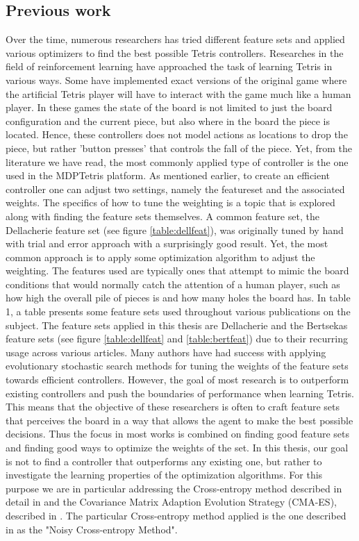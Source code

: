 \subsection{Previous work \label{prevWork}}
Over the time, numerous researchers has tried different feature 
sets and applied various optimizers to find the best 
possible Tetris controllers. Researches in the field
of reinforcement learning have approached the task of learning Tetris
in various ways. Some have implemented exact versions of the original game
where the artificial Tetris player will have to interact with the 
game much like a human player. In these games the state of the board is not limited
to just the board configuration and the current piece, but also where in the 
board the piece is located. Hence, these controllers does not model actions 
as locations to drop the piece, but rather 'button presses' that controls the
fall of the piece. Yet, from the literature we have read, the most commonly applied 
type of controller is the one used in the MDPTetris platform. As mentioned earlier,
to create an efficient controller one can adjust two settings, namely the featureset 
and the associated weights. 
The specifics of how to tune the weighting is a topic that is 
explored along with finding the feature sets themselves. A common 
feature set, the Dellacherie feature set (see figure \ref{table:dellfeat}),
was originally tuned by hand with trial and error approach with a surprisingly 
good result. Yet, the most common approach is to apply some optimization 
algorithm to adjust the weighting.
The features used are typically
ones that attempt to mimic the board conditions that would
normally catch the attention of a human player, such as
how high the overall pile of pieces is and how many holes 
the board has. In \citep{scherrer2009:b} table 1, a table 
presents some feature sets used throughout various publications
on the subject. The feature sets applied in this thesis are 
Dellacherie and the Bertsekas feature sets 
(see figure \ref{table:dellfeat} and \ref{table:bertfeat}) due 
to their recurring usage across various articles.
Many authors have had success
with applying evolutionary stochastic search methods for tuning 
the weights of the feature sets towards
efficient controllers. However, the goal of most research 
is to outperform existing controllers and push the boundaries
of performance when learning Tetris. This means that the objective of
these researchers is often to craft feature sets that perceives the 
board in a way that allows the agent to make the best possible decisions.
Thus the focus in most works is combined on finding good feature sets and 
finding good ways to optimize the weights of the set. In this thesis,
our goal is not to find a controller that outperforms any existing one,
but rather to investigate the learning properties of the optimization algorithms.
For this purpose
we are in particular addressing the
Cross-entropy method described in detail in \citep{cetut2014} and the
Covariance Matrix Adaption Evolution Strategy (CMA-ES), described 
in \citep{hansen2011}. The particular Cross-entropy method applied 
is the one described in \citep{szita:06} as the "Noisy Cross-entropy Method".\\

